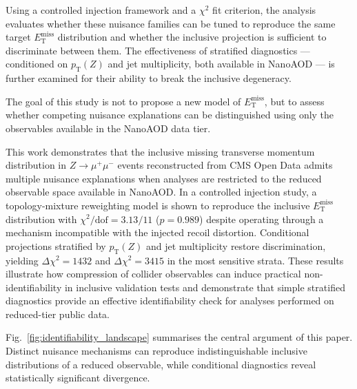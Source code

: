 \documentclass[a4paper,11pt]{article}
\newcommand{\MET}{\ensuremath{E_{\mathrm{T}}^{\mathrm{miss}}}\xspace}
\newcommand{\pTZ}{\ensuremath{p_{\mathrm{T}}(Z)}\xspace}
\newcommand{\chisq}{\ensuremath{\chi^2}\xspace}
\newcommand{\zmumu}{\ensuremath{Z\!\to\!\mu^+\mu^-}\xspace}
\begin{document}
Using a controlled injection framework and a \chisq fit criterion, the
analysis evaluates whether these nuisance families can be tuned to reproduce
the same target \MET distribution and whether the inclusive projection is
sufficient to discriminate between them.
The effectiveness of stratified diagnostics --- conditioned on \pTZ and jet
multiplicity, both available in NanoAOD --- is further examined for their
ability to break the inclusive degeneracy.

The goal of this study is not to propose a new model of \MET, but to assess
whether competing nuisance explanations can be distinguished using only the
observables available in the NanoAOD data tier.

This work demonstrates that the inclusive missing transverse momentum
distribution in \zmumu events reconstructed from CMS Open Data admits
multiple nuisance explanations when analyses are restricted to the reduced
observable space available in NanoAOD.
In a controlled injection study, a topology-mixture reweighting model is
shown to reproduce the inclusive \MET distribution with
$\chi^2/\mathrm{dof} = 3.13/11$ ($p = 0.989$) despite operating through a
mechanism incompatible with the injected recoil distortion.
Conditional projections stratified by \pTZ and jet multiplicity restore
discrimination, yielding $\Delta\chi^2 = 1432$ and $\Delta\chi^2 = 3415$
in the most sensitive strata.
These results illustrate how compression of collider observables can induce
practical non-identifiability in inclusive validation tests and demonstrate
that simple stratified diagnostics provide an effective identifiability
check for analyses performed on reduced-tier public data.

Fig.~\ref{fig:identifiability_landscape} summarises the central argument of
this paper.
Distinct nuisance mechanisms can reproduce indistinguishable inclusive
distributions of a reduced observable, while conditional diagnostics reveal
statistically significant divergence.
\end{document}
